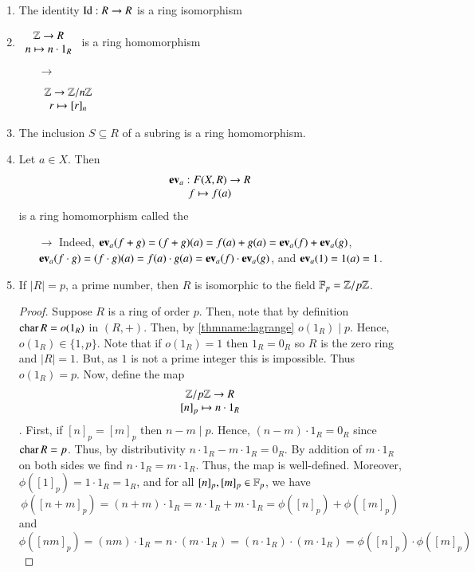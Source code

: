 \begin{example}
    \leavevmode
    \begin{enumerate}
        \item The identity $\operatorname{Id}:R \rightarrow R$ is a ring isomorphism
        \item $\begin{array}{c} \mathbb Z\rightarrow R \\ n\mapsto n\cdot 1_R \end{array}$ is a ring homomorphism
        \begin{enumerate}
            \item[$\rightarrow$] \begin{example}
                $\begin{array}{c} \mathbb Z\rightarrow \mathbb Z/n\mathbb Z \\ r \mapsto [r]_n \end{array}$
            \end{example} 
        \end{enumerate}
        \item The inclusion $S \subseteq R$ of a subring is a ring homomorphism.
        \item Let $a \in X$. Then \begin{equation}
            \begin{array}{c} \operatorname{\bf{ev}}_a:F(X,R)\rightarrow R \\ f\mapsto f(a) \end{array}
        \end{equation}
        is a ring homomorphism called the 
        \begin{enumerate}
            \item[$\rightarrow$] Indeed, $\operatorname{\bf{ev}}_a(f+g) = (f+g)(a) = f(a)+g(a) = \operatorname{\bf{ev}}_a(f) + \operatorname{\bf{ev}}_a(g)$, $\operatorname{\bf{ev}}_a(f\cdot g) = (f\cdot g)(a) = f(a)\cdot g(a) = \operatorname{\bf{ev}}_a(f)\cdot \operatorname{\bf{ev}}_a(g)$, and $\operatorname{\bf{ev}}_a(1) = 1(a) = 1$.
        \end{enumerate}
        \item If $|R| = p$, a prime number, then $R$ is isomorphic to the field $\mathbb F_p = \mathbb Z/p\mathbb Z$.
        \begin{proof}
            Suppose $R$ is a ring of order $p$. Then, note that by definition $\operatorname{char} R = o(1_R)$ in $(R,+)$. Then, by \ref{thmname:lagrange} $o(1_R)\;\vert\;p$. Hence, $o(1_R) \in \{1,p\}$. Note that if $o(1_R) = 1$ then $1_R = 0_R$ so $R$ is the zero ring and $|R| = 1$. But, as $1$ is not a prime integer this is impossible. Thus $o(1_R) = p$. Now, define the map $$\begin{array}{c} \mathbb Z/p\mathbb Z\rightarrow R \\  {[n]}_p \mapsto n\cdot 1_R \end{array}$$. First, if $[n]_p = [m]_p$ then $n - m\;\vert\;p$. Hence, $(n-m)\cdot 1_R = 0_R$ since $\operatorname{char} R = p$. Thus, by distributivity $n\cdot 1_R -m\cdot 1_R = 0_R$. By addition of $m\cdot 1_R$ on both sides we find $n\cdot 1_R = m\cdot 1_R$. Thus, the map is well-defined. Moreover, $\phi([1]_p) = 1\cdot 1_R = 1_R$, and for all $[n]_p,[m]_p \in \mathbb F_p$, we have $$\phi([n+m]_p) = (n+m)\cdot1_R = n\cdot1_R + m\cdot1_R = \phi([n]_p) + \phi([m]_p)$$ and $$\phi([nm]_p) = (nm)\cdot1_R = n\cdot(m\cdot1_R) = (n\cdot 1_R)\cdot(m\cdot1_R) = \phi([n]_p)\cdot \phi([m]_p)$$

\end{proof}
\end{enumerate}
\end{example}

